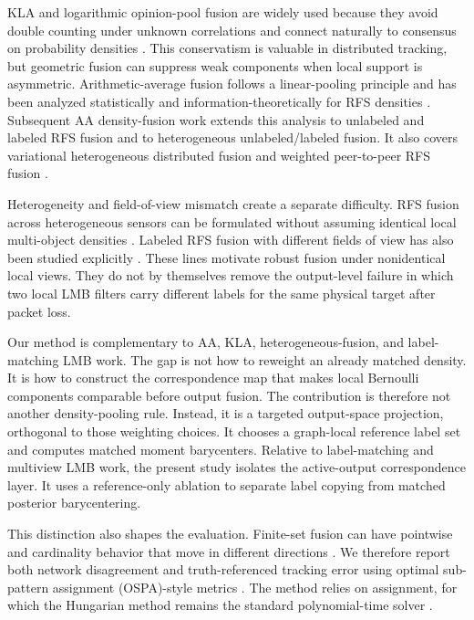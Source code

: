 \documentclass{IEEEtaes}
\begin{document}
KLA and logarithmic opinion-pool fusion are widely used because they avoid double counting under unknown correlations and connect naturally to consensus on probability densities \cite{Battistelli2014KLA}. This conservatism is valuable in distributed tracking, but geometric fusion can suppress weak components when local support is asymmetric. Arithmetic-average fusion follows a linear-pooling principle and has been analyzed statistically and information-theoretically for RFS densities \cite{Li2024AADensityFusionPartI}. Subsequent AA density-fusion work extends this analysis to unlabeled and labeled RFS fusion and to heterogeneous unlabeled/labeled fusion. It also covers variational heterogeneous distributed fusion and weighted peer-to-peer RFS fusion \cite{Li2024AADensityFusionPartII,Li2024AADensityFusion,Li2025AADensityFusionPartIV,Zheng2026DistributedWeightedRFS}.

Heterogeneity and field-of-view mismatch create a separate difficulty. RFS fusion across heterogeneous sensors can be formulated without assuming identical local multi-object densities \cite{YiChai2021HeterogeneousRFS}. Labeled RFS fusion with different fields of view has also been studied explicitly \cite{Gao2022DifferentFOV}. These lines motivate robust fusion under nonidentical local views. They do not by themselves remove the output-level failure in which two local LMB filters carry different labels for the same physical target after packet loss.

Our method is complementary to AA, KLA, heterogeneous-fusion, and label-matching LMB work. The gap is not how to reweight an already matched density. It is how to construct the correspondence map that makes local Bernoulli components comparable before output fusion. The contribution is therefore not another density-pooling rule. Instead, it is a targeted output-space projection, orthogonal to those weighting choices. It chooses a graph-local reference label set and computes matched moment barycenters. Relative to label-matching and multiview LMB work, the present study isolates the active-output correspondence layer. It uses a reference-only ablation to separate label copying from matched posterior barycentering.

This distinction also shapes the evaluation. Finite-set fusion can have pointwise and cardinality behavior that move in different directions \cite{Uney2019FiniteSetConsistency}. We therefore report both network disagreement and truth-referenced tracking error using optimal sub-pattern assignment (OSPA)-style metrics \cite{Schuhmacher2008OSPA}. The method relies on assignment, for which the Hungarian method remains the standard polynomial-time solver \cite{Kuhn1955Hungarian}.
\end{document}
